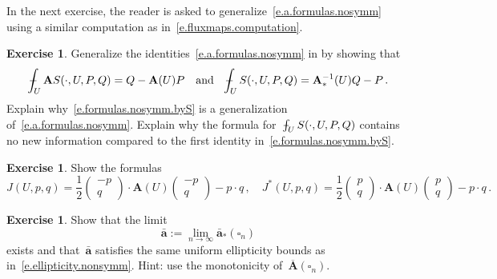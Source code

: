 \documentclass[11pt,twoside]{article} %
\let\oldsquare\square %
\renewcommand{\square}{\oldsquare}
\numberwithin{equation}{section}
\theoremstyle{definition}
\newtheorem{exercise}[theorem]{Exercise}
\newcommand{\qand}{\quad \mbox{and} \quad }
\renewcommand{\a}{\mathbf{a}}
\newcommand{\ahom}{\bar{\a}}
\newcommand{\cu}{\square}
\def\Xint#1{\mathchoice
{\XXint\displaystyle\textstyle{#1}}%
{\XXint\textstyle\scriptstyle{#1}}%
{\XXint\scriptstyle\scriptscriptstyle{#1}}%
{\XXint\scriptscriptstyle\scriptscriptstyle{#1}}%
\!\int}
\def\XXint#1#2#3{{\setbox0=\hbox{$#1{#2#3}{\int}$}
\vcenter{\hbox{$#2#3$}}\kern-.5\wd0}}
\def\fint{\Xint-}
\newcommand{\bfA}{\mathbf{A}}
\newcommand{\bfAhom}{\overline{\mathbf{A}}}
\begin{document}
In the next exercise, the reader is asked to generalize~\eqref{e.a.formulas.nosymm} using a similar computation as in~\eqref{e.fluxmaps.computation}. 
\begin{exercise}
Generalize the identities~\eqref{e.a.formulas.nosymm} in by showing that 
\begin{equation}
\label{e.formulas.nosymm.byS}
\fint_U \bfA S(\cdot,U,P,Q) = Q-\bfA(U) P 
\qand
\fint_U S(\cdot,U,P,Q) = \bfA_*^{-1}(U) Q - P 
\,.
\end{equation}
Explain why~\eqref{e.formulas.nosymm.byS} is a generalization of~\eqref{e.a.formulas.nosymm}. 
Explain why the formula for~$\fint_U  S(\cdot,U,P,Q)$ contains no new information compared to the first identity in~\eqref{e.formulas.nosymm.byS}. 
\end{exercise}

\begin{exercise}
Show the formulas 
\begin{equation} 
\label{e.J.by.means.of.bfA}
J(U,p,q) = \frac12\begin{pmatrix} -p \\ q \end{pmatrix} \cdot \bfA(U) \begin{pmatrix} -p \\ q \end{pmatrix} - p\cdot q
\,, \quad
J^*(U,p,q) = \frac12\begin{pmatrix} p \\ q \end{pmatrix} \cdot \bfA(U) \begin{pmatrix} p \\ q \end{pmatrix} - p\cdot q\,.
\end{equation}
\end{exercise}


\begin{exercise}
Show that the limit
\begin{equation}
\label{e.ahom.def.nonsymm}
\ahom:= \lim_{n\to \infty} \ahom_*(\cu_n)
\end{equation}
exists and that~$\ahom$ satisfies the same uniform ellipticity bounds as in~\eqref{e.ellipticity.nonsymm}. Hint: use the monotonicity of~$\bfAhom(\cu_n)$. 
\end{exercise}
\end{document}
